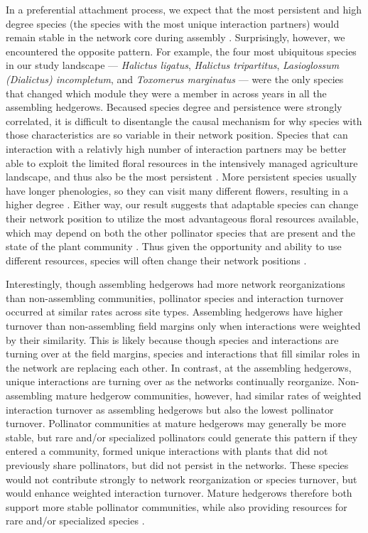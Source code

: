 \documentclass[12pt]{article}
\begin{document}
In a preferential attachment process, we expect that the most
persistent and high degree species (the species with the most unique
interaction partners) would remain stable in the network core during
assembly \citep{barabasi1999emergence}. Surprisingly, however, we
encountered the opposite pattern. For example, the four most
ubiquitous species in our study landscape --- \textit{Halictus
  ligatus}, \textit{Halictus tripartitus}, \textit{Lasioglossum
  (Dialictus) incompletum}, and \textit{Toxomerus marginatus} --- were
the only species that changed which module they were a member in
across years in all the assembling hedgerows. Becaused species degree
and persistence were strongly correlated, it is difficult to
disentangle the causal mechanism for why species with those
characteristics are so variable in their network position. Species
that can interaction with a relativly high number of interaction
partners may be better able to exploit the limited floral resources in
the intensively managed agriculture landscape, and thus also be the
most persistent \citep[in ant-plant mutualisms,
][]{diaz2010changes}. More persistent species usually have longer
phenologies, so they can visit many different flowers, resulting in a
higher degree \citep{Vazquez2009, fort2016abundance}. Either way, our
result suggests that adaptable species can change their network
position to utilize the most advantageous floral resources available,
which may depend on both the other pollinator species that are present
and the state of the plant community \citep{macleod2016measuring,
  gomez2006ecological, Waser1996}. Thus given the opportunity and
ability to use different resources, species will often change their
network positions \citep{macleod2016measuring}.

Interestingly, though assembling hedgerows had more network
reorganizations than non-assembling communities, pollinator species
and interaction turnover occurred at similar rates across site types.
Assembling hedgerows have higher turnover than non-assembling field
margins only when interactions were weighted by their similarity. This
is likely because though species and interactions are turning over at
the field margins, species and interactions that fill similar roles in
the network are replacing each other. In contrast, at the assembling
hedgerows, unique interactions are turning over as the networks
continually reorganize. Non-assembling mature hedgerow communities,
however, had similar rates of weighted interaction turnover as
assembling hedgerows but also the lowest pollinator
turnover. Pollinator communities at mature hedgerows may generally be
more stable, but rare and/or specialized pollinators could generate
this pattern if they entered a community, formed unique interactions
with plants that did not previously share pollinators, but did not
persist in the networks. These species would not contribute strongly
to network reorganization or species turnover, but would enhance
weighted interaction turnover. Mature hedgerows therefore both support
more stable pollinator communities, while also providing resources for
rare and/or specialized species \citep{kremen-2015-602,
  mgonigle-2015-x}.
\end{document}

